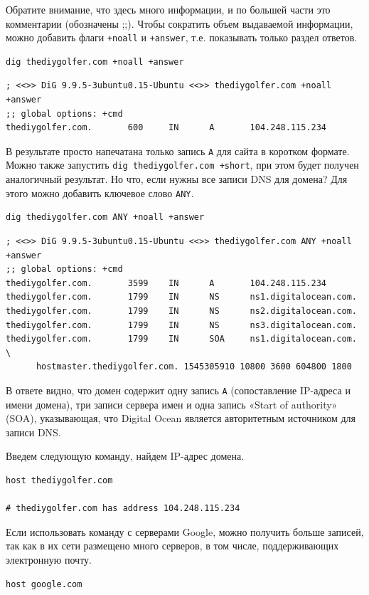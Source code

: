 \documentclass[12pt]{article}
\begin{document}
Обратите внимание, что здесь много информации, и по большей части это
комментарии (обозначены ;;). Чтобы сократить объем выдаваемой информации, можно добавить
флаги \texttt{+noall} и \texttt{+answer}, т.е. показывать только раздел
ответов.
\begin{verbatim}
dig thediygolfer.com +noall +answer
\end{verbatim}

\begin{verbatim}
; <<>> DiG 9.9.5-3ubuntu0.15-Ubuntu <<>> thediygolfer.com +noall +answer
;; global options: +cmd
thediygolfer.com.       600     IN      A       104.248.115.234
\end{verbatim}

В результате просто напечатана только запись \texttt{A} для сайта в коротком
формате. Можно также запустить \texttt{dig\ thediygolfer.com\ +short},
при этом будет получен аналогичный результат. Но что, если нужны все
записи DNS для домена? Для этого можно добавить ключевое слово \texttt{ANY}.
\begin{verbatim}
dig thediygolfer.com ANY +noall +answer
\end{verbatim}

\begin{verbatim}
; <<>> DiG 9.9.5-3ubuntu0.15-Ubuntu <<>> thediygolfer.com ANY +noall +answer
;; global options: +cmd
thediygolfer.com.       3599    IN      A       104.248.115.234
thediygolfer.com.       1799    IN      NS      ns1.digitalocean.com.
thediygolfer.com.       1799    IN      NS      ns2.digitalocean.com.
thediygolfer.com.       1799    IN      NS      ns3.digitalocean.com.
thediygolfer.com.       1799    IN      SOA     ns1.digitalocean.com. \
      hostmaster.thediygolfer.com. 1545305910 10800 3600 604800 1800
\end{verbatim}

В ответе видно, что домен содержит одну запись \texttt{A} (сопоставление
IP-адреса и имени домена), три записи сервера имен и одна запись «Start
of authority» (SOA), указывающая, что Digital Ocean является
авторитетным источником для записи DNS.

Введем следующую команду, найдем IP-адрес домена.
\begin{verbatim}
host thediygolfer.com

# thediygolfer.com has address 104.248.115.234
\end{verbatim}

Если использовать команду с серверами Google, можно получить больше
записей, так как в их сети размещено много серверов, в том числе,
поддерживающих электронную почту.
\begin{verbatim}
host google.com
\end{verbatim}
\end{document}
